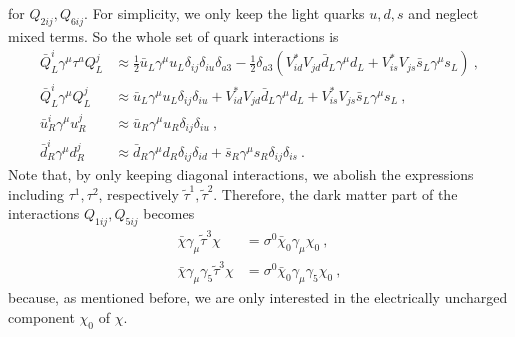 for $Q_{2ij}, Q_{6ij}$. For simplicity, we only keep the light quarks $u,d,s$ and neglect mixed terms. So the whole set of quark interactions is
\begin{align*}
	\bar{Q}_L^i\gamma^\mu\tau^a Q_L^j &\approx \frac{1}{2}\bar{u}_L\gamma^\mu u_L\delta_{ij}\delta_{iu}\delta_{a3} - \frac{1}{2}\delta_{a3}(V_{id}^*V_{jd}\bar{d}_L\gamma^\mu d_L + V_{is}^*V_{js}\bar{s}_L\gamma^\mu s_L) \ , \\
	\bar{Q}_L^i\gamma^\mu Q_L^j &\approx \bar{u}_L\gamma^\mu u_L\delta_{ij}\delta_{iu} + V_{id}^*V_{jd}\bar{d}_L\gamma^\mu d_L + V_{is}^*V_{js}\bar{s}_L\gamma^\mu s_L \ , \\
	\bar{u}_R^i\gamma^\mu u_R^j &\approx\bar{u}_R\gamma^\mu u_R\delta_{ij}\delta_{iu} \ , \\
	\bar{d}_R^i\gamma^\mu d_R^j &\approx \bar{d}_R\gamma^\mu d_R\delta_{ij}\delta_{id} + \bar{s}_R\gamma^\mu s_R\delta_{ij}\delta_{is} \ .
\end{align*}
Note that, by only keeping diagonal interactions, we abolish the expressions including $\tau^1,\tau^2$, respectively $\tilde{\tau}^1,\tilde{\tau}^2$. Therefore, the dark matter part of the interactions $Q_{1ij},Q_{5ij}$ becomes
\begin{align*}
	\bar{\chi}\gamma_\mu\tilde{\tau}^3\chi &= \sigma^0\bar{\chi}_0\gamma_\mu\chi_0 \ , \\
	\bar{\chi}\gamma_\mu\gamma_5\tilde{\tau}^3\chi &= \sigma^0\bar{\chi}_0\gamma_\mu\gamma_5\chi_0 \ ,
\end{align*}
because, as mentioned before, we are only interested in the electrically uncharged component $\chi_0$ of $\chi$.

